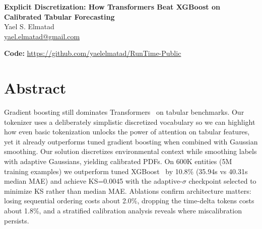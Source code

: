 \documentclass{article}
\begin{document}
\begin{center}
 {\LARGE \bf Explicit Discretization: How Transformers Beat XGBoost on Calibrated Tabular Forecasting}\\[0.5em]
  {\large Yael S. Elmatad}\\
  {\small \href{mailto:yael.elmatad@gmail.com}{yael.elmatad@gmail.com}}
\end{center}
\vspace{-1em}
\noindent\textbf{Code:} \url{https://github.com/yaelelmatad/RunTime-Public}
\section*{Abstract}
Gradient boosting still dominates Transformers~\cite{vaswani2017attention} on tabular benchmarks. Our tokenizer uses a deliberately simplistic discretized vocabulary so we can highlight how even basic tokenization unlocks the power of attention on tabular features, yet it already outperforms tuned gradient boosting when combined with Gaussian smoothing. Our solution discretizes environmental context while smoothing labels with adaptive Gaussians, yielding calibrated PDFs. On 600K entities (5M training examples) we outperform tuned XGBoost~\cite{chen2016xgboost} by 10.8\% (35.94s vs 40.31s median MAE) and achieve KS=0.0045 with the adaptive-\(\sigma\) checkpoint selected to minimize KS rather than median MAE. Ablations confirm architecture matters: losing sequential ordering costs about 2.0\%, dropping the time-delta tokens costs about 1.8\%, and a stratified calibration analysis reveals where miscalibration persists.
\end{document}

